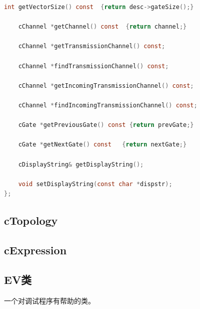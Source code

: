 \begin{lstlisting}[language=c]
    int getVectorSize() const  {return desc->gateSize();}

    cChannel *getChannel() const  {return channel;}

    cChannel *getTransmissionChannel() const;

    cChannel *findTransmissionChannel() const;

    cChannel *getIncomingTransmissionChannel() const;

    cChannel *findIncomingTransmissionChannel() const;
  
    cGate *getPreviousGate() const {return prevGate;}

    cGate *getNextGate() const   {return nextGate;}

    cDisplayString& getDisplayString();

    void setDisplayString(const char *dispstr);
};
\end{lstlisting}

\subsection{cTopology}
\label{ctopology}

\subsection{cExpression}
\label{cexpression}

\subsection{EV类}
\label{ev类}

一个对调试程序有帮助的类。

